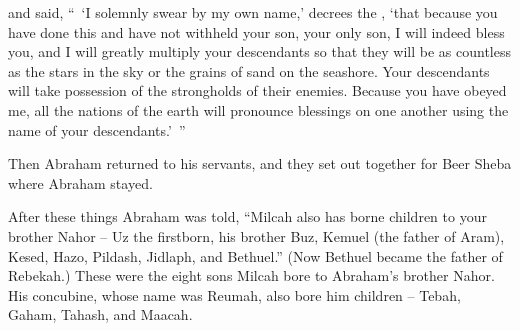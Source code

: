 {and said,
“ ‘I solemnly swear
by my own name,’ decrees the
{}, ‘that because
you have
done
this
and have not
withheld
your son,
your only son,
I will indeed
bless
you, and I will greatly multiply
your descendants
so that they will be as countless as the stars
in the sky
or the grains of sand
on
the seashore.
Your descendants
will take possession
of the strongholds
of their enemies.
Because
you have
obeyed
me,
all
the nations
of the earth
will pronounce
blessings
on one another using the name of your descendants.’ ”
\par }{\PP {}Then Abraham
returned
to
his servants,
and they set out
together
for Beer Sheba
where Abraham
stayed.
\par }{\PP {}After
these
things
Abraham
was
told,
“Milcah
also
has borne children
to your brother
Nahor –
Uz
the firstborn,
his brother
Buz,
Kemuel
(the father
of Aram),
Kesed,
Hazo,
Pildash,
Jidlaph,
and Bethuel.”
(Now Bethuel
became the father
of Rebekah.) These
were the eight
sons Milcah
bore
to Abraham’s
brother
Nahor.
His concubine,
whose name
was Reumah,
also
bore him children – Tebah, Gaham, Tahash, and Maacah.

}
